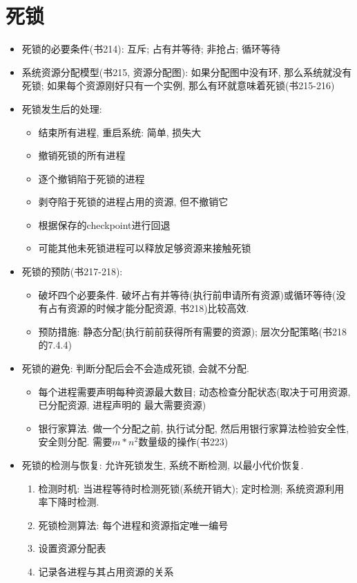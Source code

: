 \documentclass[a4paper, UTF8]{article}
\begin{document}
\section{死锁}
\begin{itemize}
\item 死锁的必要条件(书214): 互斥; 占有并等待; 非抢占; 循环等待
\item 系统资源分配模型(书215, 资源分配图): 如果分配图中没有环, 那么系统就没有死锁; 如果每个资源刚好只有一个实例, 那么有环就意味着死锁(书215-216)
\item 死锁发生后的处理: 
	\begin{itemize}
	\item 结束所有进程, 重启系统: 简单, 损失大
	\item 撤销死锁的所有进程
	\item 逐个撤销陷于死锁的进程
	\item 剥夺陷于死锁的进程占用的资源, 但不撤销它
	\item 根据保存的checkpoint进行回退
	\item 可能其他未死锁进程可以释放足够资源来接触死锁
	\end{itemize}
\item 死锁的预防(书217-218): 
	\begin{itemize}
	\item 破坏四个必要条件. 破坏占有并等待(执行前申请所有资源)或循环等待(没有占有资源的时候才能分配资源, 书218)比较高效.
	\item 预防措施: 静态分配(执行前前获得所有需要的资源); 层次分配策略(书218的7.4.4)
	\end{itemize}
\item 死锁的避免: 判断分配后会不会造成死锁, 会就不分配.
	\begin{itemize}
	\item 每个进程需要声明每种资源最大数目; 动态检查分配状态(取决于可用资源, 已分配资源, 进程声明的
	最大需要资源)
	\item 银行家算法. 做一个分配之前, 执行试分配, 然后用银行家算法检验安全性, 安全则分配. 需要$m*n^2$数量级的操作(书223)
	\end{itemize}
\item 死锁的检测与恢复: 允许死锁发生, 系统不断检测, 以最小代价恢复.
	\begin{enumerate}
	\item 检测时机: 当进程等待时检测死锁(系统开销大); 定时检测; 系统资源利用率下降时检测.
	\item 死锁检测算法: 每个进程和资源指定唯一编号
	\item 设置资源分配表
	\item 记录各进程与其占用资源的关系

\end{enumerate}
\end{itemize}
\end{document}
